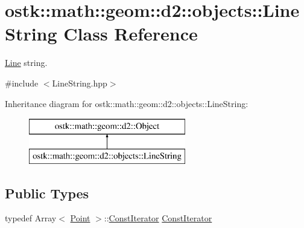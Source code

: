 \hypertarget{classostk_1_1math_1_1geom_1_1d2_1_1objects_1_1_line_string}{}\section{ostk\+:\+:math\+:\+:geom\+:\+:d2\+:\+:objects\+:\+:Line\+String Class Reference}
\label{classostk_1_1math_1_1geom_1_1d2_1_1objects_1_1_line_string}


\hyperlink{classostk_1_1math_1_1geom_1_1d2_1_1objects_1_1_line}{Line} string.  




{\ttfamily \#include $<$Line\+String.\+hpp$>$}

Inheritance diagram for ostk\+:\+:math\+:\+:geom\+:\+:d2\+:\+:objects\+:\+:Line\+String\+:\begin{figure}[H]
\begin{center}
\leavevmode
\includegraphics[height=2.000000cm]{classostk_1_1math_1_1geom_1_1d2_1_1objects_1_1_line_string}
\end{center}
\end{figure}
\subsection*{Public Types}
\begin{DoxyCompactItemize}
\item 
typedef Array$<$ \hyperlink{classostk_1_1math_1_1geom_1_1d2_1_1objects_1_1_point}{Point} $>$\+::\hyperlink{classostk_1_1math_1_1geom_1_1d2_1_1objects_1_1_line_string_a29e6326c716bef2ec438534cfdc1e118}{Const\+Iterator} \hyperlink{classostk_1_1math_1_1geom_1_1d2_1_1objects_1_1_line_string_a29e6326c716bef2ec438534cfdc1e118}{Const\+Iterator}
\end{DoxyCompactItemize}
